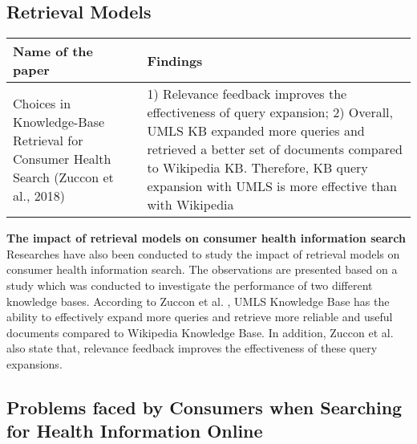 \documentclass[]{article}
\begin{document}
\subsection{Retrieval Models}  

\begin{center}
	\begin{tabular}{||p{4cm} | p{10cm}||} 
		\hline
		\textbf{Name of the paper} & \textbf{Findings}\\ [0.5ex] 
		\hline\hline
		 Choices in Knowledge-Base Retrieval for Consumer Health Search (Zuccon et al., 2018) & 1) Relevance feedback improves the effectiveness of query expansion; 2) Overall, UMLS KB expanded more queries and retrieved a better set of documents compared to Wikipedia KB. Therefore, KB query expansion with UMLS is more effective than with Wikipedia \\		
		\hline
	\end{tabular}	
	
\end{center}  

\textbf{The impact of retrieval models on consumer health information search}\\ 


Researches have also been conducted to study the impact of retrieval models on consumer health information search. The observations are presented based on a study which was conducted to investigate the performance of two different knowledge bases. According to Zuccon et al. \cite{zuccon2018choices}, UMLS Knowledge Base has the ability to effectively expand more queries and retrieve more reliable and useful documents compared to Wikipedia Knowledge Base. In addition, Zuccon et al. \cite{zuccon2018choices} also state that, relevance feedback improves the effectiveness of these query expansions.  
	
\subsection{Problems faced by Consumers when Searching for Health Information Online}
\end{document}
